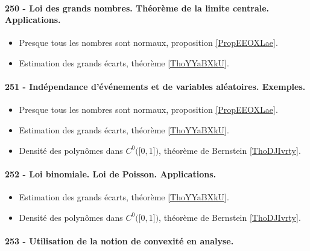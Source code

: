 \paragraph{250 - Loi des grands nombres. Théorème de la limite centrale. Applications.}
\begin{itemize}
    \item Presque tous les nombres sont normaux, proposition \ref{PropEEOXLae}.
    \item Estimation des grands écarts, théorème \ref{ThoYYaBXkU}.
\end{itemize}
\paragraph{251 - Indépendance d’événements et de variables aléatoires. Exemples.}
\begin{itemize}
    \item Presque tous les nombres sont normaux, proposition \ref{PropEEOXLae}.
    \item Estimation des grands écarts, théorème \ref{ThoYYaBXkU}.
    \item Densité des polynômes dans \( C^0\big( \mathopen[ 0 , 1 \mathclose] \big)\), théorème de Bernstein \ref{ThoDJIvrty}.
\end{itemize}

\paragraph{252 - Loi binomiale. Loi de Poisson. Applications.}
\begin{itemize}
    \item Estimation des grands écarts, théorème \ref{ThoYYaBXkU}.
    \item Densité des polynômes dans \( C^0\big( \mathopen[ 0 , 1 \mathclose] \big)\), théorème de Bernstein \ref{ThoDJIvrty}.
\end{itemize}


\paragraph{253 - Utilisation de la notion de convexité en analyse.}

